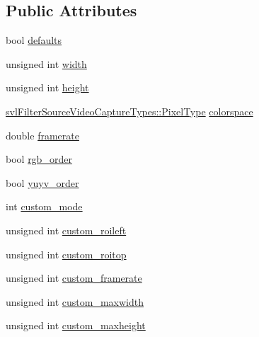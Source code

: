 \subsection*{Public Attributes}
\begin{DoxyCompactItemize}
\item 
bool \hyperlink{classsvl_filter_source_video_capture_types_1_1_image_format_a7c3d1c2c1fdfa3eb84d5e175bb62540f}{defaults}
\item 
unsigned int \hyperlink{classsvl_filter_source_video_capture_types_1_1_image_format_a240891b8edeff025cfc146a8bf0f10c8}{width}
\item 
unsigned int \hyperlink{classsvl_filter_source_video_capture_types_1_1_image_format_abb7d4da368b6bd7aea523163bece5d56}{height}
\item 
\hyperlink{namespacesvl_filter_source_video_capture_types_a6b2f5fb1010bb41e1fb7232f88fc515f}{svl\-Filter\-Source\-Video\-Capture\-Types\-::\-Pixel\-Type} \hyperlink{classsvl_filter_source_video_capture_types_1_1_image_format_a22a7b205fee2bf868890165f55c9b098}{colorspace}
\item 
double \hyperlink{classsvl_filter_source_video_capture_types_1_1_image_format_a1d13e39b8f47f5505b1aebeea7dfbbf4}{framerate}
\item 
bool \hyperlink{classsvl_filter_source_video_capture_types_1_1_image_format_a2fc3d0ae433e5def9e7f24d653ae8b47}{rgb\-\_\-order}
\item 
bool \hyperlink{classsvl_filter_source_video_capture_types_1_1_image_format_a7cbd79938ec75e77ea6cb6d8b0d414a0}{yuyv\-\_\-order}
\item 
int \hyperlink{classsvl_filter_source_video_capture_types_1_1_image_format_ab7168d8a514625e6d284515b6ce5260e}{custom\-\_\-mode}
\item 
unsigned int \hyperlink{classsvl_filter_source_video_capture_types_1_1_image_format_aa25b5c1bc445a3e4acfeb6b011914dc6}{custom\-\_\-roileft}
\item 
unsigned int \hyperlink{classsvl_filter_source_video_capture_types_1_1_image_format_acbbfb2564be79e788caff9b05119f725}{custom\-\_\-roitop}
\item 
unsigned int \hyperlink{classsvl_filter_source_video_capture_types_1_1_image_format_a596ab75ce0db32080b998848a16ff1b2}{custom\-\_\-framerate}
\item 
unsigned int \hyperlink{classsvl_filter_source_video_capture_types_1_1_image_format_ac9f69e49b8131198d899837d6905ad42}{custom\-\_\-maxwidth}
\item 
unsigned int \hyperlink{classsvl_filter_source_video_capture_types_1_1_image_format_aa23473103487ad59d5efc9b353b28f41}{custom\-\_\-maxheight}

\end{DoxyCompactItemize}
